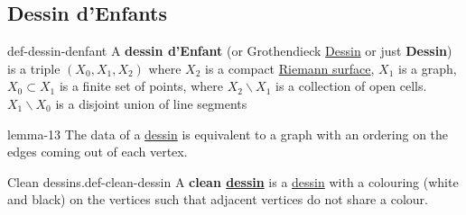 \documentclass[10pt,]{book}
\newcommand{\terminology}[1]{\textbf{#1}}
\numberwithin{equation}{section}
\begin{document}
\subsection[{Dessin d'Enfants}]{Dessin d'Enfants}\label{subsection-39}
\begin{definition}{}{def-dessin-denfant}%
\hypertarget{p-465}{}%
A \terminology{dessin d'Enfant} (or Grothendieck \hyperref[def-dessin-denfant]{Dessin} or just \terminology{Dessin}) is a triple \((X_0,X_1,X_2)\) where \(X_2\) is a compact \hyperref[def-top-riem-surface]{Riemann surface}, \(X_1\) is a graph, \(X_0 \subset X_1\) is a finite set of points, where \(X_2 \smallsetminus X_1\) is a collection of open cells. \(X_1 \smallsetminus X_0\) is a disjoint union of line segments%
\end{definition}
\begin{lemma}{}{}{lemma-13}%
\hypertarget{p-466}{}%
The data of a \hyperref[def-dessin-denfant]{dessin} is equivalent to a graph with an ordering on the edges coming out of each vertex.%
\end{lemma}
\begin{definition}{Clean dessins.}{def-clean-dessin}%
\hypertarget{p-467}{}%
A \terminology{clean \hyperref[def-dessin-denfant]{dessin}} is a \hyperref[def-dessin-denfant]{dessin} with a colouring (white and black) on the vertices such that adjacent vertices do not share a colour.%
\end{definition}
%
%
\typeout{************************************************}
\typeout{************************************************}
%
\end{document}
